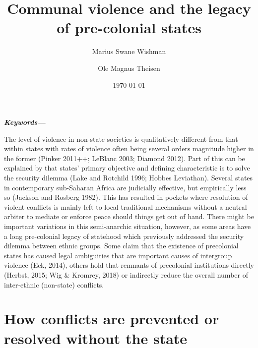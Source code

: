 \documentclass[12pt]{article}
\title{Communal violence and the legacy of pre-colonial states}
\author[1]{Marius Swane Wishman}
\author[2]{Ole Magnus Theisen}
\affil[1,2]{Department of Sociology and Political Science, NTNU}
\date{\today}
\providecommand{\keywords}[1]
{
	\small	
	\textbf{\textit{Keywords---}} #1
}
\begin{document}
\maketitle

\begin{abstract}
\end{abstract}

\keywords{}

\pagebreak

\onehalfspacing

The level of violence in non-state societies is qualitatively different from
that within states with rates of violence often being several orders magnitude
higher in the former (Pinker 2011++; LeBlanc 2003; Diamond 2012). Part of this
can be explained by that states’ primary objective and defining characteristic
is to solve the security dilemma (Lake and Rotchild 1996; Hobbes Leviathan).
Several states in contemporary sub-Saharan Africa are judicially effective, but
empirically less so (Jackson and Rosberg 1982). This has resulted in pockets
where resolution of violent conflicts is mainly left to local traditional
mechanisms without a neutral arbiter to mediate or enforce peace should things
get out of hand. There might be important variations in this semi-anarchic
situation, however, as some areas have a long pre-colonial legacy of statehood
which previously addressed the security dilemma between ethnic groups. Some
claim that the existence of precolonial states has caused legal ambiguities that
are important causes of intergroup violence (Eck, 2014), others hold that
remnants of precolonial institutions directly (Herbst, 2015; Wig \& Kromrey,
2018) or indirectly reduce the overall number of inter-ethnic (non-state)
conflicts. 

\section{How conflicts are prevented or resolved without the state}
\end{document}
